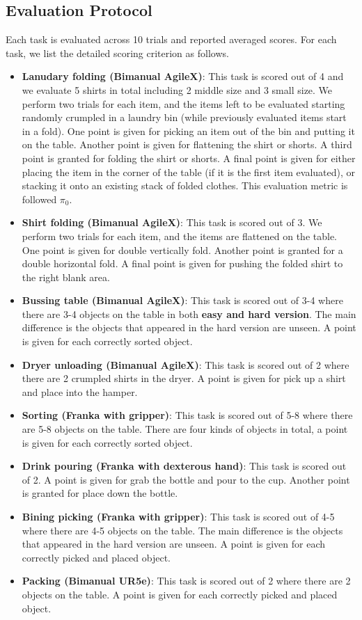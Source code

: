 \begin{appendix}
\subsection{Evaluation Protocol}
Each task is evaluated across 10 trials and reported averaged scores. For each task, we list the detailed scoring criterion as follows.
\begin{itemize}
    \item \textbf{Lanudary folding (Bimanual AgileX)}: This task is scored out of 4 and we evaluate 5 shirts in total including 2 middle size and 3 small size. We perform two trials for each item, and the items left to be evaluated starting randomly crumpled in a laundry bin (while previously evaluated items start in a fold). One point is given for picking an item out of the bin and putting it on the table. Another point is given for flattening the shirt or shorts. A third point is granted for folding the shirt or shorts. A final point is given for either placing the item in the corner of the table (if it is the first item evaluated), or stacking it onto an existing stack of folded clothes. This evaluation metric is followed $\pi_{0}$. 
    \item \textbf{Shirt folding (Bimanual AgileX)}: This task is scored out of 3. We perform two trials for each item, and the items are flattened on the table. One point is given for double vertically fold. Another point is granted for a double horizontal fold. A final point is given for pushing the folded shirt to the right blank area.
    \item \textbf{Bussing table (Bimanual AgileX)}: This task is scored out of 3-4 where there are 3-4 objects on the table in both \textbf{easy and hard version}. The main difference is the objects that appeared in the hard version are unseen. A point is given for each correctly sorted object.
    \item \textbf{Dryer unloading (Bimanual AgileX)}: This task is scored out of 2 where there are 2 crumpled shirts in the dryer. A point is given for pick up a shirt and place into the hamper.
    \item \textbf{Sorting (Franka with gripper)}: This task is scored out of 5-8 where there are 5-8 objects on the table. There are four kinds of objects in total, a point is given for each correctly sorted object.
    \item \textbf{Drink pouring (Franka with dexterous hand)}: This task is scored out of 2. A point is given for grab the bottle and pour to the cup. Another point is granted for place down the bottle.
    \item \textbf{Bining picking (Franka with gripper)}: This task is scored out of 4-5 where there are 4-5 objects on the table. The main difference is the objects that appeared in the hard version are unseen. A point is given for each correctly picked and placed object.
    \item \textbf{Packing (Bimanual UR5e)}: This task is scored out of 2 where there are 2 objects on the table. A point is given for each correctly picked and placed object.
\end{itemize}




\end{appendix}
